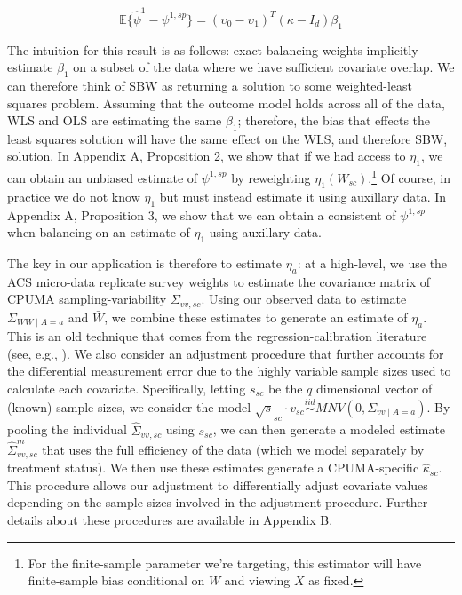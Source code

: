 \begin{equation}
\mathbb{E}\{\hat{\psi}^{1} - \psi^{1, sp}\} = (\upsilon_0 - \upsilon_1)^T(\kappa - I_d)\beta_1
\end{equation}

The intuition for this result is as follows: exact balancing weights implicitly estimate $\beta_1$ on a subset of the data where we have sufficient covariate overlap. We can therefore think of SBW as returning a solution to some weighted-least squares problem. Assuming that the outcome model holds across all of the data, WLS and OLS are estimating the same $\beta_1$; therefore, the bias that effects the least squares solution will have the same effect on the WLS, and therefore SBW, solution. In Appendix A, Proposition 2, we show that if we had access to $\eta_1$, we can obtain an unbiased estimate of $\psi^{1, sp}$ by reweighting $\eta_1(W_{sc})$.\footnote{For the finite-sample parameter we're targeting, this estimator will have finite-sample bias conditional on $W$ and viewing $X$ as fixed.} Of course, in practice we do not know $\eta_1$ but must instead estimate it using auxillary data. In Appendix A, Proposition 3, we show that we can obtain a consistent of $\psi^{1, sp}$ when balancing on an estimate of $\eta_1$ using auxillary data. 

The key in our application is therefore to estimate $\eta_a$: at a high-level, we use the ACS micro-data replicate survey weights to estimate the covariance matrix of CPUMA sampling-variability $\Sigma_{vv, sc}$. Using our observed data to estimate $\Sigma_{WW \mid A = a}$ and $\bar{W}$, we combine these estimates to generate an estimate of $\eta_a$. This is an old technique that comes from the regression-calibration literature (see, e.g., \cite{gleser1992importance}). We also consider an adjustment procedure that further accounts for the differential measurement error due to the highly variable sample sizes used to calculate each covariate. Specifically, letting $s_{sc}$ be the $q$ dimensional vector of (known) sample sizes, we consider the model $\sqrt{s}_{sc} \cdot v_{sc} \stackrel{iid}\sim MNV(0, \Sigma_{vv \mid A = a})$. By pooling the individual $\hat{\Sigma}_{vv, sc}$ using $s_{sc}$, we can then generate a modeled estimate $\hat{\Sigma}^m_{vv, sc}$ that uses the full efficiency of the data (which we model separately by treatment status). We then use these estimates generate a CPUMA-specific $\hat{\kappa}_{sc}$. This procedure allows our adjustment to differentially adjust covariate values depending on the sample-sizes involved in the adjustment procedure. Further details about these procedures are available in Appendix B.

